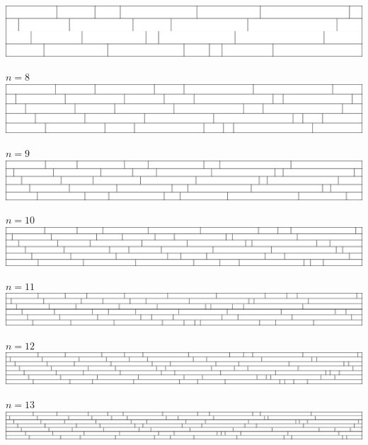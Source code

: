 \includegraphics[width=\textwidth]{../solutions/7}
\par\vspace{1em}
$n = 8$\\
\includegraphics[width=\textwidth]{../solutions/8}
\par\vspace{1em}
$n = 9$\\
\includegraphics[width=\textwidth]{../solutions/9}
\par\vspace{1em}
$n = 10$\\
\includegraphics[width=\textwidth]{../solutions/10}
\par\vspace{1em}
$n = 11$\\
\includegraphics[width=\textwidth]{../solutions/11}
\par\vspace{1em}
$n = 12$\\
\includegraphics[width=\textwidth]{../solutions/12}
\par\vspace{1em}
$n = 13$\\
\includegraphics[width=\textwidth]{../solutions/13}
